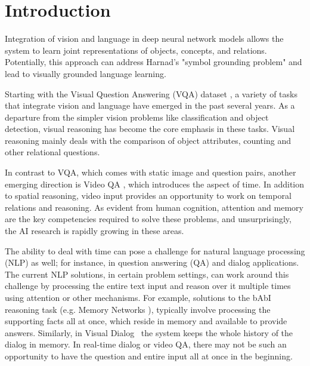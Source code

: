 \section{Introduction}

Integration of vision and language in deep neural network models allows the system to learn joint representations of objects, concepts, and relations.  Potentially, this approach can address Harnad's "symbol grounding problem" \cite{harnad2003symbol} and lead to visually grounded language learning.

Starting with the Visual Question Answering (VQA) dataset \cite{}, a variety of tasks that integrate vision and language have emerged in the past several years\cite{mogadala2019trends}.  As a departure from the simpler vision problems like classification and object detection, visual reasoning has become the core emphasis in these tasks. Visual reasoning mainly deals with the comparison of object attributes, counting and other relational questions.

In contrast to VQA, which comes with static image and question pairs, another emerging direction is Video QA \cite{}, which introduces the aspect of time.  In addition to spatial reasoning, video input provides an opportunity to work on temporal relations and reasoning.  As evident from human cognition, attention and memory are the key competencies required to solve these problems, and unsurprisingly, the AI research is rapidly growing in these areas.

The ability to deal with time can pose a challenge for natural language processing (NLP) as well; for instance, in question answering (QA) and dialog applications.  The current NLP solutions, in certain problem settings, can work around this challenge by processing the entire text input and reason over it multiple times using attention \cite{vaswani2017attention} or other mechanisms. For example, solutions to the bAbI reasoning task (e.g. Memory Networks \cite{weston2015towards}), typically involve processing the supporting facts all at once, which reside in memory and available to provide answers. Similarly, in Visual Dialog~\cite{das2017visual} the system keeps the whole history of the dialog in memory.  In real-time dialog or video QA, there may not be such an opportunity to have the question and entire input all at once in the beginning.  

